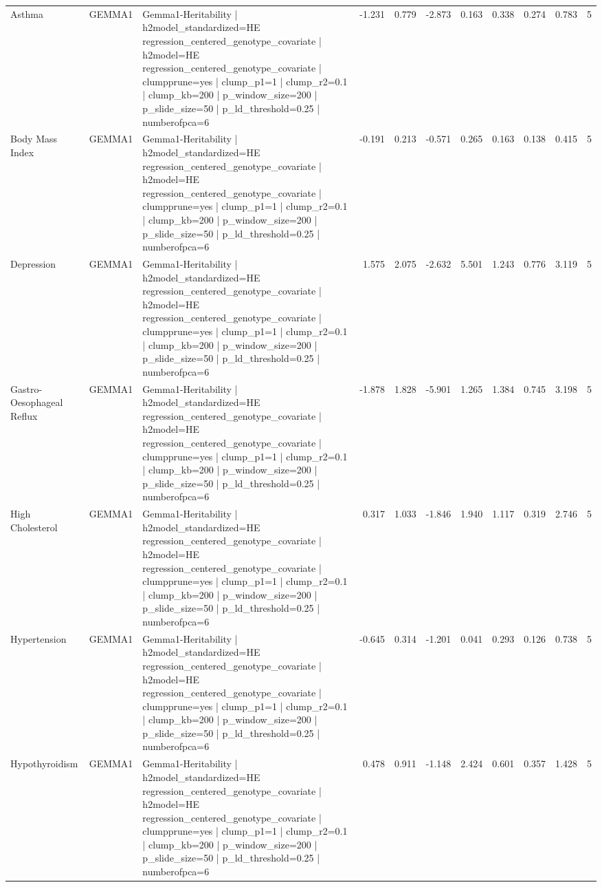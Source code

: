 \begin{landscape}
\begin{longtable}{p{2.4cm}p{1.8cm}p{6.0cm}rrrrrrrr}
Asthma & GEMMA1 & Gemma1-Heritability | h2model\_standardized=HE regression\_centered\_genotype\_covariate | h2model=HE regression\_centered\_genotype\_covariate | clumpprune=yes | clump\_p1=1 | clump\_r2=0.1 | clump\_kb=200 | p\_window\_size=200 | p\_slide\_size=50 | p\_ld\_threshold=0.25 | numberofpca=6 & -1.231 & 0.779 & -2.873 & 0.163 & 0.338 & 0.274 & 0.783 & 5 \\
Body Mass Index & GEMMA1 & Gemma1-Heritability | h2model\_standardized=HE regression\_centered\_genotype\_covariate | h2model=HE regression\_centered\_genotype\_covariate | clumpprune=yes | clump\_p1=1 | clump\_r2=0.1 | clump\_kb=200 | p\_window\_size=200 | p\_slide\_size=50 | p\_ld\_threshold=0.25 | numberofpca=6 & -0.191 & 0.213 & -0.571 & 0.265 & 0.163 & 0.138 & 0.415 & 5 \\
Depression & GEMMA1 & Gemma1-Heritability | h2model\_standardized=HE regression\_centered\_genotype\_covariate | h2model=HE regression\_centered\_genotype\_covariate | clumpprune=yes | clump\_p1=1 | clump\_r2=0.1 | clump\_kb=200 | p\_window\_size=200 | p\_slide\_size=50 | p\_ld\_threshold=0.25 | numberofpca=6 & 1.575 & 2.075 & -2.632 & 5.501 & 1.243 & 0.776 & 3.119 & 5 \\
Gastro-Oesophageal Reflux & GEMMA1 & Gemma1-Heritability | h2model\_standardized=HE regression\_centered\_genotype\_covariate | h2model=HE regression\_centered\_genotype\_covariate | clumpprune=yes | clump\_p1=1 | clump\_r2=0.1 | clump\_kb=200 | p\_window\_size=200 | p\_slide\_size=50 | p\_ld\_threshold=0.25 | numberofpca=6 & -1.878 & 1.828 & -5.901 & 1.265 & 1.384 & 0.745 & 3.198 & 5 \\
High Cholesterol & GEMMA1 & Gemma1-Heritability | h2model\_standardized=HE regression\_centered\_genotype\_covariate | h2model=HE regression\_centered\_genotype\_covariate | clumpprune=yes | clump\_p1=1 | clump\_r2=0.1 | clump\_kb=200 | p\_window\_size=200 | p\_slide\_size=50 | p\_ld\_threshold=0.25 | numberofpca=6 & 0.317 & 1.033 & -1.846 & 1.940 & 1.117 & 0.319 & 2.746 & 5 \\
Hypertension & GEMMA1 & Gemma1-Heritability | h2model\_standardized=HE regression\_centered\_genotype\_covariate | h2model=HE regression\_centered\_genotype\_covariate | clumpprune=yes | clump\_p1=1 | clump\_r2=0.1 | clump\_kb=200 | p\_window\_size=200 | p\_slide\_size=50 | p\_ld\_threshold=0.25 | numberofpca=6 & -0.645 & 0.314 & -1.201 & 0.041 & 0.293 & 0.126 & 0.738 & 5 \\
Hypothyroidism & GEMMA1 & Gemma1-Heritability | h2model\_standardized=HE regression\_centered\_genotype\_covariate | h2model=HE regression\_centered\_genotype\_covariate | clumpprune=yes | clump\_p1=1 | clump\_r2=0.1 | clump\_kb=200 | p\_window\_size=200 | p\_slide\_size=50 | p\_ld\_threshold=0.25 | numberofpca=6 & 0.478 & 0.911 & -1.148 & 2.424 & 0.601 & 0.357 & 1.428 & 5 \\

\end{longtable}
\end{landscape}

